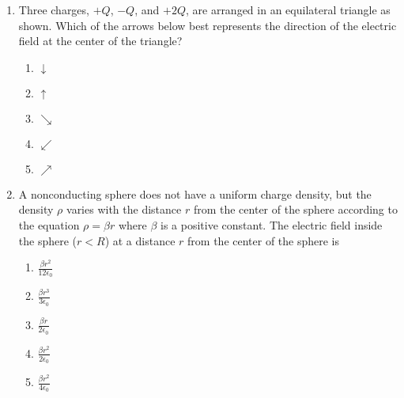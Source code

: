 \documentclass{../../oss-apphys}
\begin{document}
\begin{multicols}{2}
\begin{enumerate}[leftmargin=18pt]
  \item Three charges, $+Q$, $−Q$, and $+2Q$, are arranged in an equilateral
    triangle as shown. Which of the arrows below best represents the direction
    of the electric field at the center of the triangle?
    \begin{center}
      \vspace{-.1in}
    \end{center}
    \begin{enumerate}[noitemsep,topsep=0pt,leftmargin=18pt,label=(\Alph*)]
    \item $\displaystyle\downarrow$
    \item $\displaystyle\uparrow$
    \item $\displaystyle\searrow$
    \item $\displaystyle\swarrow$
    \item $\displaystyle\nearrow$
    \end{enumerate}
  
  \item A nonconducting sphere does not have a uniform charge density, but the
    density $\rho$ varies with the distance $r$ from the center of the sphere
    according to the equation $\rho=\beta r$ where $\beta$ is a positive
    constant. The electric field inside the sphere ($r<R$) at a distance $r$
    from the center of the sphere is
    \begin{enumerate}[noitemsep,topsep=0pt,leftmargin=18pt,label=(\Alph*)]
    \item $\displaystyle\frac{\beta r^2}{12\epsilon_0}$
    \item $\displaystyle\frac{\beta r^3}{3\epsilon_0}$
    \item $\displaystyle\frac{\beta r}{2\epsilon_0}$
    \item $\displaystyle\frac{\beta r^2}{2\epsilon_0}$
    \item $\displaystyle\frac{\beta r^2}{4\epsilon_0}$
    \end{enumerate}
  

\end{enumerate}
\end{multicols}
\end{document}
